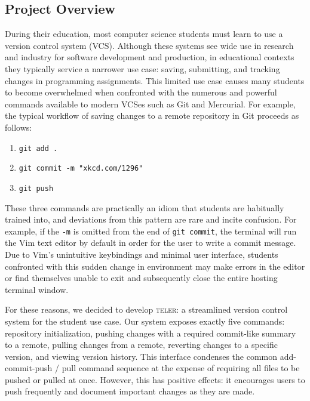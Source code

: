 \documentclass[11pt, letterpaper]{article}
\begin{document}
\maketitle
\begin{multicols}{2}
  \section{Project Overview}
  \label{sec:overview}

  During their education, most computer science students must learn to
  use a version control system (VCS). Although these systems see wide
  use in research and industry for software development and
  production, in educational contexts they typically service a
  narrower use case: saving, submitting, and tracking changes in
  programming assignments. This limited use case causes many students
  to become overwhelmed when confronted with the numerous and powerful
  commands available to modern VCSes such as Git and Mercurial. For
  example, the typical workflow of saving changes to a remote
  repository in Git proceeds as follows:

  \begin{enumerate}
  \item \texttt{git add .}
  \item \texttt{git commit -m "xkcd.com/1296"}
  \item \texttt{git push}
  \end{enumerate}

  These three commands are practically an idiom that students are
  habitually trained into, and deviations from this pattern are rare
  and incite confusion. For example, if the \texttt{-m} is omitted
  from the end of \texttt{git commit}, the terminal will run the Vim
  text editor by default in order for the user to write a commit
  message. Due to Vim's unintuitive keybindings and minimal user
  interface, students confronted with this sudden change in
  environment may make errors in the editor or find themselves unable
  to exit and subsequently close the entire hosting terminal window.

  For these reasons, we decided to develop \textsc{teler}: a
  streamlined version control system for the student use case. Our
  system exposes exactly five commands: repository initialization,
  pushing changes with a required commit-like summary to a remote,
  pulling changes from a remote, reverting changes to a specific
  version, and viewing version history. This interface condenses the
  common add-commit-push / pull command sequence at the expense of
  requiring all files to be pushed or pulled at once. However, this
  has positive effects: it encourages users to push frequently and
  document important changes as they are made.


\end{multicols}
\end{document}
